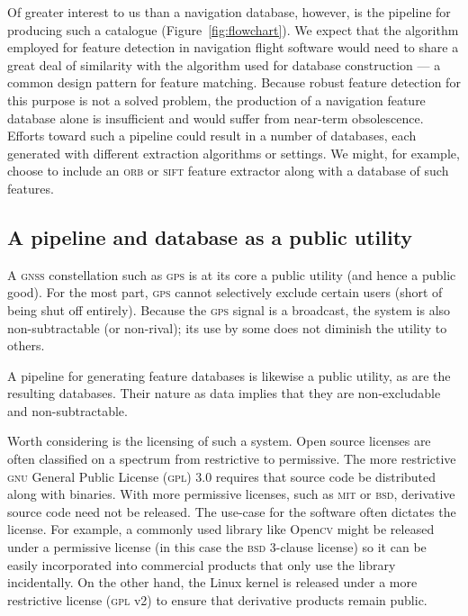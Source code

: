 \documentclass[12pt]{olfmemo}
\begin{document}
Of greater interest to us than a navigation database, however, is the pipeline for producing such a catalogue (Figure~\ref{fig:flowchart}). We expect that the algorithm employed for feature detection in navigation flight software would need to share a great deal of similarity with the algorithm used for database construction --- a common design pattern for feature matching. Because robust feature detection for this purpose is not a solved problem, the production of a navigation feature database alone is insufficient and would suffer from near-term obsolescence. Efforts toward such a pipeline could result in a number of databases, each generated with different extraction algorithms or settings. We might, for example, choose to include an \textsc{orb} or \textsc{sift} feature extractor along with a database of such features.

\subsection{A pipeline and database as a public utility}
A \textsc{gnss} constellation such as \textsc{gps} is at its core a public utility (and hence a public good). For the most part, \textsc{gps} cannot selectively exclude certain users (short of being shut off entirely). Because the \textsc{gps} signal is a broadcast, the system is also non-subtractable (or non-rival); its use by some does not diminish the utility to others.

A pipeline for generating feature databases is likewise a public utility, as are the resulting databases. Their nature as data implies that they are non-excludable and non-subtractable. 

Worth considering is the licensing of such a system. Open source licenses are often classified on a spectrum from restrictive to permissive. The more restrictive \textsc{gnu} General Public License (\textsc{gpl}) 3.0 requires that source code be distributed along with binaries. With more permissive licenses, such as \textsc{mit} or \textsc{bsd}, derivative source code need not be released. The use-case for the software often dictates the license. For example, a commonly used library like Open\textsc{cv} might be released under a permissive license (in this case the \textsc{bsd} 3-clause license) so it can be easily incorporated into commercial products that only use the library incidentally. On the other hand, the Linux kernel is released under a more restrictive license (\textsc{gpl} v2) to ensure that derivative products remain public.
\end{document}
